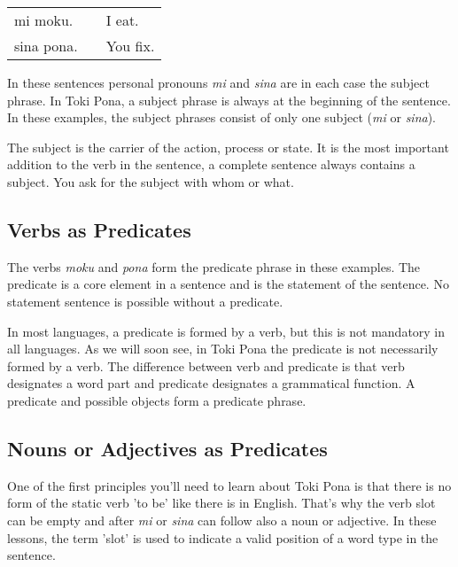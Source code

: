 \begin{supertabular}{p{5,5cm}|ll}
    mi moku.   &  & I eat.   \\
    sina pona. &  & You fix. \\
\end{supertabular}

In these sentences personal pronouns \textit{mi} and \textit{sina} are in each case the subject phrase.
In Toki Pona, a subject phrase is always at the beginning of the sentence.
In these examples, the subject phrases consist of only one subject (\textit{mi} or \textit{sina}).

The subject is the carrier of the action, process or state.
It is the most important addition to the verb in the sentence, a complete sentence always contains a subject.
You ask for the subject with whom or what.

%
\subsection*{Verbs as Predicates}
%

The verbs \textit{moku} and \textit{pona} form the predicate phrase in these examples.
The predicate is a core element in a sentence and is the statement of the sentence.
No statement sentence is possible without a predicate.

In most languages, a predicate is formed by a verb, but this is not mandatory in all languages.
As we will soon see, in Toki Pona the predicate is not necessarily formed by a verb.
The difference between verb and predicate is that verb designates a word part and predicate designates a grammatical function.
A predicate and possible objects form a predicate phrase.
%
\subsection*{Nouns or Adjectives as Predicates}
%
%
%
One of the first principles you'll need to learn about Toki Pona is that there is no form of the static verb 'to be' like there is in English.
That's why the verb slot can be empty and after \textit{mi} or \textit{sina} can follow also a noun or adjective.
In these lessons, the term 'slot' is used to indicate a valid position of a word type in the sentence.

